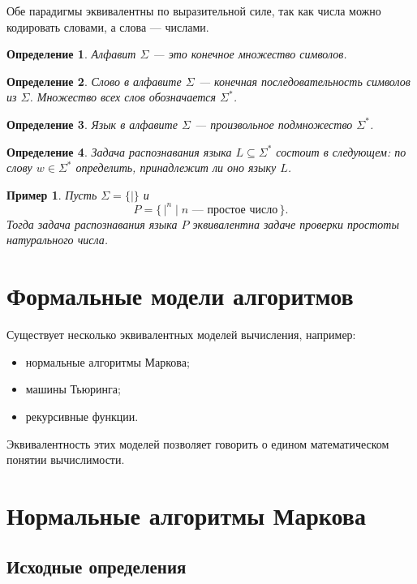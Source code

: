 \documentclass[12pt,a4paper]{article}
\newtheorem{definition}{Определение}
\newtheorem{example}{Пример}
\begin{document}
Обе парадигмы эквивалентны по выразительной силе, так как числа можно кодировать словами, а слова --- числами.

\begin{definition}
Алфавит $\Sigma$ --- это конечное множество символов.
\end{definition}

\begin{definition}
Слово в алфавите $\Sigma$ --- конечная последовательность символов из $\Sigma$.
Множество всех слов обозначается $\Sigma^*$.
\end{definition}

\begin{definition}
Язык в алфавите $\Sigma$ --- произвольное подмножество $\Sigma^*$.
\end{definition}

\begin{definition}
Задача распознавания языка $L \subseteq \Sigma^*$ состоит в следующем: по слову $w\in\Sigma^*$ определить, принадлежит ли оно языку $L$.
\end{definition}

\begin{example}
Пусть $\Sigma=\{| \}$ и
\[
P=\{\,|^n \mid n \text{ --- простое число}\,\}.
\]
Тогда задача распознавания языка $P$ эквивалентна задаче проверки простоты натурального числа.
\end{example}

\section{Формальные модели алгоритмов}
Существует несколько эквивалентных моделей вычисления, например:
\begin{itemize}
    \item нормальные алгоритмы Маркова;
    \item машины Тьюринга;
    \item рекурсивные функции.
\end{itemize}

Эквивалентность этих моделей позволяет говорить о едином математическом понятии вычислимости.

\section{Нормальные алгоритмы Маркова}

\subsection{Исходные определения}
\end{document}
